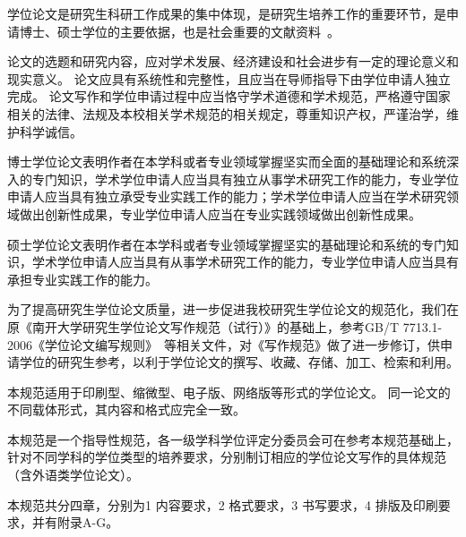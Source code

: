 \begin{preface}
    学位论文是研究生科研工作成果的集中体现，是研究生培养工作的重要环节，是申请博士、硕士学位的主要依据，也是社会重要的文献资料~\cite{REF00000001}。

    论文的选题和研究内容，应对学术发展、经济建设和社会进步有一定的理论意义和现实意义。
    论文应具有系统性和完整性，且应当在导师指导下由学位申请人独立完成。
    论文写作和学位申请过程中应当恪守学术道德和学术规范，严格遵守国家相关的法律、法规及本校相关学术规范的相关规定，尊重知识产权，严谨治学，维护科学诚信。

    博士学位论文表明作者在本学科或者专业领域掌握坚实而全面的基础理论和系统深入的专门知识，学术学位申请人应当具有独立从事学术研究工作的能力，专业学位申请人应当具有独立承受专业实践工作的能力；学术学位申请人应当在学术研究领域做出创新性成果，专业学位申请人应当在专业实践领域做出创新性成果。

    硕士学位论文表明作者在本学科或者专业领域掌握坚实的基础理论和系统的专门知识，学术学位申请人应当具有从事学术研究工作的能力，专业学位申请人应当具有承担专业实践工作的能力。

    为了提高研究生学位论文质量，进一步促进我校研究生学位论文的规范化，我们在原《南开大学研究生学位论文写作规范（试行）》的基础上，参考GB/T 7713.1-2006《学位论文编写规则》~\cite{SCSF00000378}等相关文件，对《写作规范》做了进一步修订，供申请学位的研究生参考，以利于学位论文的撰写、收藏、存储、加工、检索和利用。

    本规范适用于印刷型、缩微型、电子版、网络版等形式的学位论文。
    同一论文的不同载体形式，其内容和格式应完全一致。

    本规范是一个指导性规范，各一级学科学位评定分委员会可在参考本规范基础上，针对不同学科的学位类型的培养要求，分别制订相应的学位论文写作的具体规范（含外语类学位论文）。

    本规范共分四章，分别为1 内容要求，2 格式要求，3 书写要求，4 排版及印刷要求，并有附录A-G。
\end{preface}
